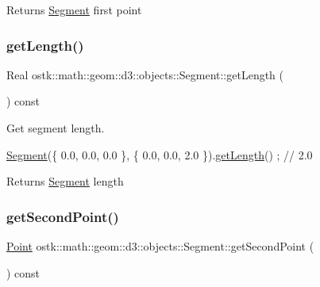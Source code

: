 \begin{DoxyReturn}{Returns}
\hyperlink{classostk_1_1math_1_1geom_1_1d3_1_1objects_1_1_segment}{Segment} first point 
\end{DoxyReturn}
\mbox{\label{classostk_1_1math_1_1geom_1_1d3_1_1objects_1_1_segment_a0f40747b4f8da2ef00b57ff0e4445968}} 
\subsubsection{\texorpdfstring{get\+Length()}{getLength()}}
{\footnotesize\ttfamily Real ostk\+::math\+::geom\+::d3\+::objects\+::\+Segment\+::get\+Length (\begin{DoxyParamCaption}{ }\end{DoxyParamCaption}) const}



Get segment length. 


\begin{DoxyCode}
\hyperlink{classostk_1_1math_1_1geom_1_1d3_1_1objects_1_1_segment_aa2cb60ce06335a5f76120c658219494c}{Segment}(\{ 0.0, 0.0, 0.0 \}, \{ 0.0, 0.0, 2.0 \}).\hyperlink{classostk_1_1math_1_1geom_1_1d3_1_1objects_1_1_segment_a0f40747b4f8da2ef00b57ff0e4445968}{getLength}() ; \textcolor{comment}{// 2.0}
\end{DoxyCode}


\begin{DoxyReturn}{Returns}
\hyperlink{classostk_1_1math_1_1geom_1_1d3_1_1objects_1_1_segment}{Segment} length 
\end{DoxyReturn}
\mbox{\label{classostk_1_1math_1_1geom_1_1d3_1_1objects_1_1_segment_a194f50a9505400681ba0bb15ae999465}} 
\subsubsection{\texorpdfstring{get\+Second\+Point()}{getSecondPoint()}}
{\footnotesize\ttfamily \hyperlink{classostk_1_1math_1_1geom_1_1d3_1_1objects_1_1_point}{Point} ostk\+::math\+::geom\+::d3\+::objects\+::\+Segment\+::get\+Second\+Point (\begin{DoxyParamCaption}{ }\end{DoxyParamCaption}) const}



